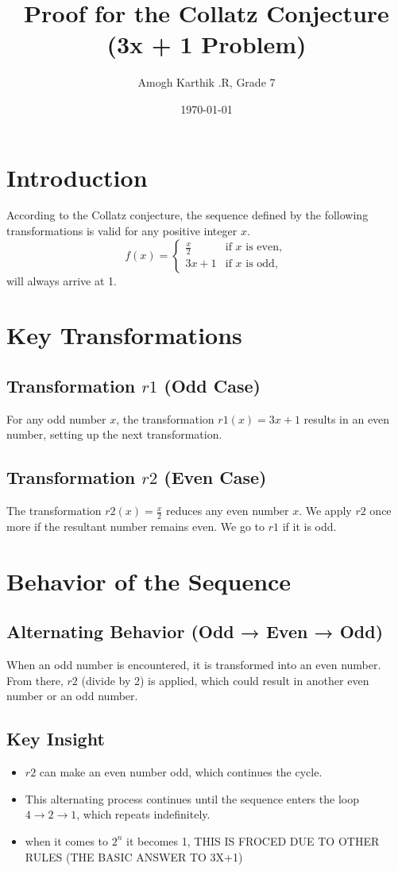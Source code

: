 \documentclass[12pt]{article}
\title{Proof for the Collatz Conjecture (3x + 1 Problem)}
\author{Amogh Karthik .R, Grade 7}
\date{\today}
\begin{document}
\maketitle

\section*{Introduction}
According to the Collatz conjecture, the sequence defined by the following transformations is valid for any positive integer \( x \).
\[
    f(x) =
    \begin{cases}
        \frac{x}{2} & \text{if } x \text{ is even}, \\
        3x + 1 & \text{if } x \text{ is odd},
    \end{cases}
\]
will always arrive at 1.

\section*{Key Transformations}
\subsection*{Transformation \( r1 \) (Odd Case)}
For any odd number \( x \), the transformation \( r1(x) = 3x + 1 \) results in an even number, setting up the next transformation.

\subsection*{Transformation \( r2 \) (Even Case)}
The transformation \( r2(x) = \frac{x}{2} \) reduces any even number \( x \). We apply \( r2 \) once more if the resultant number remains even. We go to \( r1 \) if it is odd.

\section*{Behavior of the Sequence}
\subsection*{Alternating Behavior (Odd → Even → Odd)}
When an odd number is encountered, it is transformed into an even number. From there, \( r2 \) (divide by 2) is applied, which could result in another even number or an odd number. 

\subsection*{Key Insight}
\begin{itemize}
    \item \( r2 \) can make an even number odd, which continues the cycle.
    \item This alternating process continues until the sequence enters the loop \( 4 \to 2 \to 1 \), which repeats indefinitely. 
    \item when it comes to  \( 2^n \) it becomes 1, THIS IS FROCED DUE TO OTHER RULES (THE BASIC ANSWER TO 3X+1)
\end{itemize}
\end{document}
